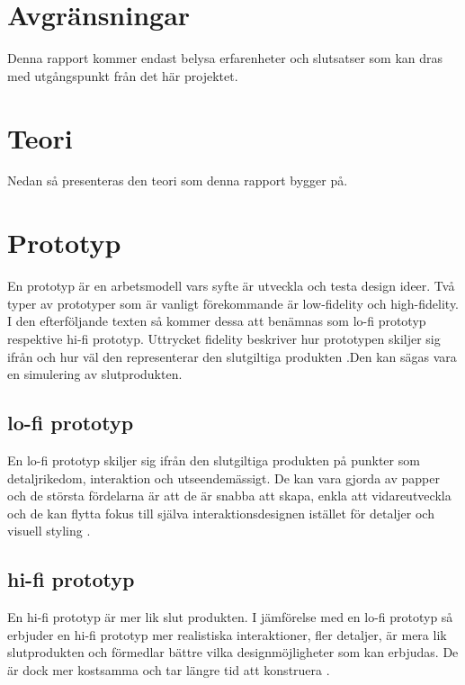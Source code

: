 \section{Avgränsningar}
Denna rapport kommer endast belysa erfarenheter och slutsatser som kan dras med utgångspunkt från det här projektet.

\section{Teori}
Nedan så presenteras den teori som denna rapport bygger på.

\section{Prototyp}
En prototyp är en arbetsmodell vars syfte är utveckla och testa design ideer. Två typer av prototyper som är vanligt förekommande är low-fidelity och high-fidelity. I den efterföljande texten så  kommer dessa att benämnas som lo-fi prototyp respektive hi-fi prototyp. Uttrycket fidelity beskriver hur prototypen skiljer sig ifrån och hur väl den representerar den slutgiltiga produkten \cite{prototypeChoise}.Den kan sägas vara en simulering av slutprodukten.     

\subsection{lo-fi prototyp}
En lo-fi prototyp skiljer sig ifrån den slutgiltiga produkten på punkter som detaljrikedom, interaktion och utseendemässigt. De kan vara gjorda av papper och de största fördelarna är att de är snabba att skapa, enkla att vidareutveckla  och de kan flytta fokus till själva interaktionsdesignen istället för detaljer och visuell styling \cite{prototypeChoise}.

\subsection{hi-fi prototyp}
En hi-fi prototyp är mer lik slut produkten.  I jämförelse med en lo-fi prototyp så erbjuder en hi-fi prototyp mer realistiska interaktioner, fler detaljer, är mera lik slutprodukten och förmedlar bättre vilka designmöjligheter som kan erbjudas. De är dock mer kostsamma och tar längre tid att konstruera \cite{prototypeChoise}.

